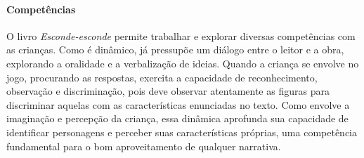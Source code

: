 \documentclass[11pt]{extarticle}
\begin{document}
\paragraph{Competências}
O livro \textit{Esconde-esconde} permite trabalhar e explorar diversas competências com as crianças. Como é dinâmico, já pressupõe um diálogo entre o leitor e a obra, explorando a oralidade e a verbalização de ideias. Quando a criança se envolve no jogo, procurando as respostas, exercita a capacidade de reconhecimento, observação e discriminação, pois deve observar atentamente as figuras para discriminar aquelas com as características enunciadas no texto. Como envolve a imaginação e percepção da criança, essa dinâmica aprofunda sua capacidade de identificar personagens e perceber suas características próprias, uma competência fundamental para o bom aproveitamento de qualquer narrativa.

\reversemarginpar
\marginparwidth=5cm

\end{document}
